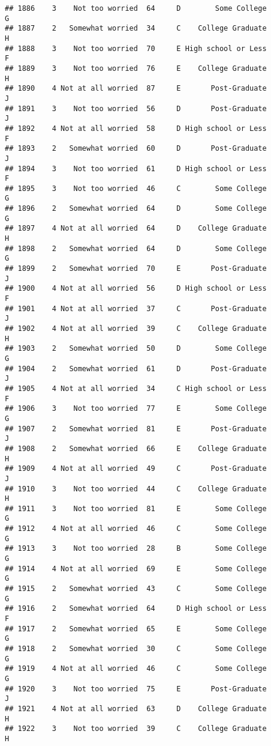 \documentclass[
]{article}
\begin{document}
\begin{verbatim}
## 1886    3    Not too worried  64     D        Some College         G
## 1887    2   Somewhat worried  34     C    College Graduate         H
## 1888    3    Not too worried  70     E High school or Less         F
## 1889    3    Not too worried  76     E    College Graduate         H
## 1890    4 Not at all worried  87     E       Post-Graduate         J
## 1891    3    Not too worried  56     D       Post-Graduate         J
## 1892    4 Not at all worried  58     D High school or Less         F
## 1893    2   Somewhat worried  60     D       Post-Graduate         J
## 1894    3    Not too worried  61     D High school or Less         F
## 1895    3    Not too worried  46     C        Some College         G
## 1896    2   Somewhat worried  64     D        Some College         G
## 1897    4 Not at all worried  64     D    College Graduate         H
## 1898    2   Somewhat worried  64     D        Some College         G
## 1899    2   Somewhat worried  70     E       Post-Graduate         J
## 1900    4 Not at all worried  56     D High school or Less         F
## 1901    4 Not at all worried  37     C       Post-Graduate         J
## 1902    4 Not at all worried  39     C    College Graduate         H
## 1903    2   Somewhat worried  50     D        Some College         G
## 1904    2   Somewhat worried  61     D       Post-Graduate         J
## 1905    4 Not at all worried  34     C High school or Less         F
## 1906    3    Not too worried  77     E        Some College         G
## 1907    2   Somewhat worried  81     E       Post-Graduate         J
## 1908    2   Somewhat worried  66     E    College Graduate         H
## 1909    4 Not at all worried  49     C       Post-Graduate         J
## 1910    3    Not too worried  44     C    College Graduate         H
## 1911    3    Not too worried  81     E        Some College         G
## 1912    4 Not at all worried  46     C        Some College         G
## 1913    3    Not too worried  28     B        Some College         G
## 1914    4 Not at all worried  69     E        Some College         G
## 1915    2   Somewhat worried  43     C        Some College         G
## 1916    2   Somewhat worried  64     D High school or Less         F
## 1917    2   Somewhat worried  65     E        Some College         G
## 1918    2   Somewhat worried  30     C        Some College         G
## 1919    4 Not at all worried  46     C        Some College         G
## 1920    3    Not too worried  75     E       Post-Graduate         J
## 1921    4 Not at all worried  63     D    College Graduate         H
## 1922    3    Not too worried  39     C    College Graduate         H

\end{verbatim}
\end{document}
